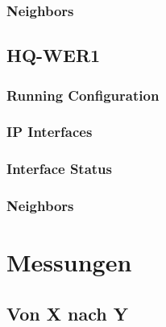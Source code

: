 \subsubsection{Neighbors}


\subsection{HQ-WER1}
\subsubsection{Running Configuration}


\subsubsection{IP Interfaces}


\subsubsection{Interface Status}


\subsubsection{Neighbors}


\section{Messungen}
\label{appendix:measures}
\subsection{Von X nach Y}





%  
% 

